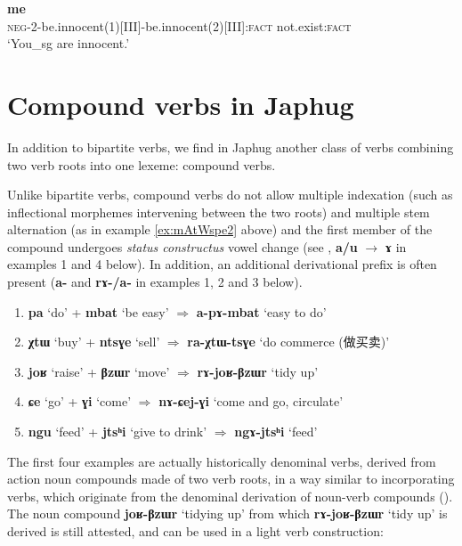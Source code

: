 \documentclass[oneside,a4paper,11pt]{article}
\newcommand{\ipa}[1]{{\phon\textbf{#1}}}
\newcommand{\zh}[1]{{\cn #1}}
\newcommand{\jpg}[2]{\ipa{#1} `#2'}
\begin{document}
\begin{exe}
\ex \label{ex:mAtWspe2}
\gll \ipa{mɤ-tɯ-spe=rke} \ipa{me} \\
\textsc{neg}-2-be.innocent(1)[III]-be.innocent(2)[III]:\textsc{fact} not.exist:\textsc{fact} \\
\glt `You_{sg} are innocent.'
\end{exe} 

\section{Compound verbs in Japhug} \label{sec:compounds}
In addition to bipartite verbs, we find in Japhug another class of verbs combining two verb roots into one lexeme: compound verbs.

Unlike bipartite verbs,  compound verbs do not allow multiple indexation (such as inflectional morphemes intervening between the two roots) and multiple stem alternation (as in example \ref{ex:mAtWspe2} above) and the first member of the compound undergoes \textit{status constructus} vowel change (see  \citealt[1215]{jacques12incorp}, \ipa{a/u} $\rightarrow$ \ipa{ɤ} in examples 1 and 4 below). In addition, an additional derivational prefix is often present (\ipa{a-} and \ipa{rɤ-/a-} in examples 1, 2 and 3 below).

\begin{enumerate}
\item \jpg{pa}{do} + \jpg{mbat}{be easy} $\Rightarrow$ \jpg{a-pɤ-mbat}{easy to do}
\item \jpg{χtɯ}{buy} + \jpg{ntsɣe}{sell} $\Rightarrow$ \jpg{ra-χtɯ-tsɣe}{do commerce (\zh{做买卖})} 
\item \jpg{joʁ}{raise} + \jpg{βzɯr}{move}   $\Rightarrow$  \jpg{rɤ-joʁ-βzɯr}{tidy up}
\item \jpg{ɕe}{go} + \jpg{ɣi}{come} $\Rightarrow$ \jpg{nɤ-ɕej-ɣi}{come and go, circulate} 
\item \jpg{ngu}{feed} + \jpg{jtsʰi}{give to drink} $\Rightarrow$ \jpg{ngɤ-jtsʰi}{feed}
\end{enumerate}

The first four examples are actually historically denominal verbs, derived from action noun compounds made of two verb roots, in a way similar to incorporating verbs, which originate from the denominal derivation of noun-verb compounds (\citealt{jacques12incorp}). The noun compound \jpg{joʁ-βzɯr}{tidying up} from which \jpg{rɤ-joʁ-βzɯr}{tidy up} is derived is still attested, and can be used in a light verb construction:
\end{document}
